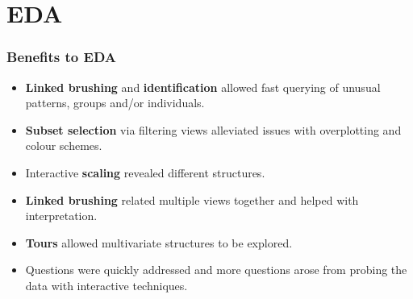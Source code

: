 \documentclass{beamer}
\begin{document}
\section{EDA}
\label{sec:EDA}

	\begin{frame}
	\frametitle{Benefits to EDA}
	\begin{itemize}
		\item \textbf{Linked brushing} and \textbf{identification} allowed fast querying of unusual patterns, groups and/or individuals.
		\item \textbf{Subset selection} via filtering views alleviated issues with overplotting and colour schemes.
		\item Interactive \textbf{scaling} revealed different structures.
		\item \textbf{Linked brushing} related multiple views together and helped with interpretation.
		\item \textbf{Tours} allowed multivariate structures to be explored.
		\item Questions were quickly addressed and more questions arose from probing the data with interactive techniques.
	
	\end{itemize}
	\end{frame}


\end{document}
